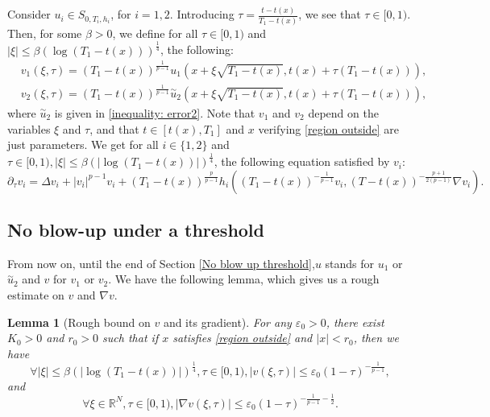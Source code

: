 \documentclass[11pt,a4paper]{article}
\newcommand{\1}{\mathbbm{1}}
\numberwithin{equation}{section}
\newcommand{\numberset}{\mathbb}
\newcommand{\R}{\numberset{R}}
\newtheorem{lemma}{Lemma}[section]
\theoremstyle{remark}
\begin{document}
Consider $u_i\in S_{0,T_i,h_i}$, for $i=1,2$. Introducing $\tau=\frac{t-t(x)}{T_1-t(x)}$, we see that $\tau\in [0,1)$.
Then, for some $\beta>0$, we define for all $\tau\in [0,1)$ and $|\xi|\leq \beta (\log(T_1-t(x)))^{\frac{1}{4}}$, the following:
\begin{equation}\label{def: v}
\begin{split}
&v_1(\xi,\tau)=(T_1-t(x))^{\frac{1}{p-1}}u_1(x+\xi\sqrt{T_1-t(x)},t(x)+\tau (T_1-t(x))),\\
&v_2(\xi,\tau)=(T_1-t(x))^{\frac{1}{p-1}}\overset{\sim}{u}_2(x+\xi\sqrt{T_1-t(x)},t(x)+\tau (T_1-t(x))),
\end{split}
\end{equation}
where $\overset{\sim}{u}_2$ is given in \eqref{inequality: error2}. Note that $v_1$ and $v_2$ depend on the variables $\xi$ and $\tau$, and that $t\in [t(x),T_1]$ and $x$ verifying \eqref{region outside} are just parameters. We get for all $i\in\{1,2\}$ and $\tau\in[0,1),|\xi|\leq\beta (|\log(T_1-t(x))|)^{\frac{1}{4}}$, the following equation satisfied by $v_i$:
\begin{equation}\label{eq vi}
\partial_\tau v_{i}=\Delta v_{i}+|v_{i}|^{p-1}v_{i}+(T_1-t(x))^{\frac{p}{p-1}}h_i\left((T_1-t(x))^{-\frac{1}{p-1}}v_i,(T-t(x))^{-\frac{p+1}{2(p-1)}}\nabla v_i\right).
\end{equation}



\subsection{No blow-up under a threshold}
From now on, until the end of Section \ref{No blow up threshold},$u$ stands for $u_1$ or $\overset{\sim}{u}_2$ and $v$ for $v_1$ or $v_2$. We have the following lemma, which gives us a rough estimate on $v$ and $\nabla v$.
\begin{lemma}[Rough bound on $v$ and its gradient]\label{Lemma rough estimate}
For any $\varepsilon_0 > 0$, there exist $K_0 > 0$ and $r_0 > 0$ such that if $x$ satisfies \eqref{region outside} and $|x| < r_0$, then we have
$$\forall |\xi|\leq\beta (|\log(T_1-t(x))|)^{\frac{1}{4}},\tau\in[0,1), |v(\xi,\tau)|\leq \varepsilon_0(1-\tau)^{-\frac{1}{p-1}}, $$
and
$$\forall \xi\in \R^N, \tau \in [0,1),|\nabla v(\xi,\tau)|\leq \varepsilon_0 (1-\tau)^{-\frac{1}{p-1}-\frac{1}{2}}.$$

\end{lemma}
\end{document}
